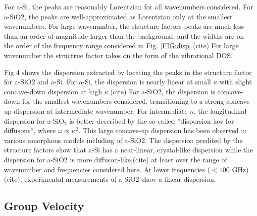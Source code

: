 \documentclass[aps,prb,twocolumn,superscriptaddress,footinbib,amsmath,amssymb,floatfix]{revtex4}
\begin{document}
For a-Si, the peaks are reasonably Lorentzian for all wavenumbers considered.
\cite{feldman_calculations_2002} 
For a-SiO2, the peaks are well-approximated as Lorentzian only at the 
smallest wavenumbers. For 
large wavenumber, the structure factors peaks are much less than an order 
of magnitude larger than the background, and the widths are on the order 
of the frequency range considered in Fig. \ref{FIG:disp}.(cite) For 
large wavenumber the structrue factor takes on the form of the vibrational 
DOS. 

Fig 4 shows the dispersion extracted by locating the peaks in 
the structure factor for a-SiO2 and a-Si. For a-Si, the dispersion is 
nearly linear at small $\kappa$ with slight concave-down dispersion at 
high $\kappa$.(cite) For a-SiO2, the dispersion is concave-down for 
the smallest wavenumbers considered, transitioning to a strong 
concave-up dispersion at intermediate wavenumber. 
For intermediate $\kappa$, the longitudinal dispersion for a-SiO$_2$ 
is better-described by the so-called 
''dispersion law for diffusons``, where $\omega \propto \kappa^2$.
\cite{beltukov_ioffe-regel_2013} This large concave-up dispersion has been 
observed in various amorphous models\cite{feldman_calculations_2002} 
including of a-SiO2.\cite{ruzicka_evidence_2004} 
The dispersion predited by the structure factors show that a-Si 
has a near-linear, crystal-like dispersion while the dispersion 
for a-SiO2 is more diffuson-like,(cite) at least over the range of 
wavenumber and frequencies considered here.  At lower frequencies 
($< 100$ GHz)(cite), experimental measurements of a-SiO2 show a 
linear dispersion. 

\subsection{\label{S:Structure}Group Velocity}
\end{document}
